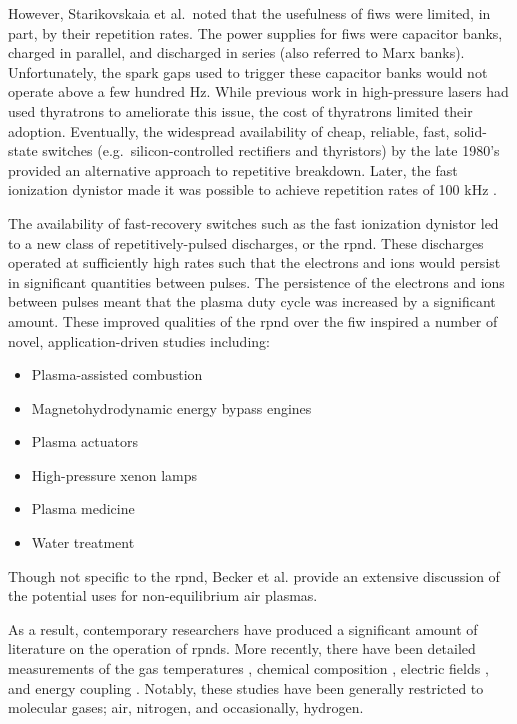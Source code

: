 However, Starikovskaia et al.\ noted that the usefulness of \acs{fiw}s were
limited, in part, by their repetition rates. The power supplies for \acs{fiw}s
were capacitor banks, charged in parallel, and discharged in series (also
referred to Marx banks). Unfortunately, the spark gaps used to trigger these
capacitor banks would not operate above a few hundred Hz. While previous work in
high-pressure lasers had used thyratrons to ameliorate this issue, the cost of
thyratrons limited their adoption. Eventually, the widespread availability of
cheap, reliable, fast, solid-state switches (e.g.\ silicon-controlled rectifiers
and thyristors) by the late 1980's provided an alternative approach to
repetitive breakdown. Later, the fast ionization dynistor made it was possible
to achieve repetition rates of 100 kHz \cite{Efanov1997}.

The availability of fast-recovery switches such as the fast ionization dynistor
led to a new class of repetitively-pulsed discharges, or the \acs{rpnd}. These
discharges operated at sufficiently high rates such that the electrons and ions
would persist in significant quantities between pulses. The persistence of the
electrons and ions between pulses meant that the plasma duty cycle was increased
by a significant amount. These improved qualities of the \acs{rpnd} over the
\acs{fiw} inspired a number of novel, application-driven studies including:
\begin{itemize}
  \item Plasma-assisted combustion \cite{Pancheshnyi2006, Starikovskaia2006, 
        Adamovich2008}
  \item Magnetohydrodynamic energy bypass engines \cite{Macheret2002,
        Adamovich2008, Schneider2009a}
  \item Plasma actuators \cite{Starikovskii2009, Adamovich2009}
  \item High-pressure xenon lamps \cite{Nikandrov2008}
  \item Plasma medicine \cite{Ayan2009, Zimmermann2012}
  \item Water treatment \cite{Foster2013}
\end{itemize}
Though not specific to the \acs{rpnd}, Becker et al. \cite{Becker2005} provide
an extensive discussion of the potential uses for non-equilibrium air plasmas.

As a result, contemporary researchers have produced a significant amount of
literature on the operation of \acs{rpnd}s. More recently, there have been
detailed measurements of the gas temperatures \cite{Pilla2006, Pancheshnyi2006,
Nishihara2006, Bao2007, Lou2007, Pai2009, Zuzeek2010, Nishihara2011}, chemical
composition \cite{Bao2007, Lou2007, Pai2009}, electric fields \cite{Ito2009,
Ito2010, Muller2011a}, and energy coupling \cite{Macheret2006, Pancheshnyi2006}.
Notably, these studies have been generally restricted to molecular gases; air,
nitrogen, and occasionally, hydrogen.

